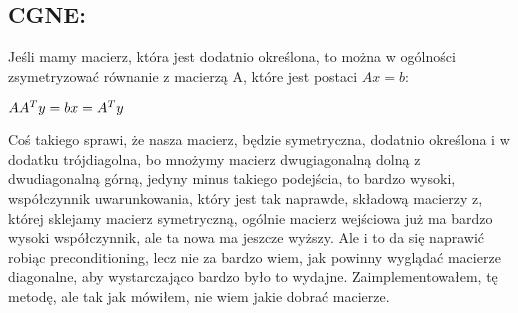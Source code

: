 \documentclass[12pt]{article}
\begin{document}
\subsection{CGNE: }
Jeśli mamy macierz, która jest dodatnio określona, to można w ogólności zsymetryzować równanie z macierzą A, które jest postaci $Ax=b$:
\begin{center}
$
AA^{T}y=b \newline
x=A^{T}y
$
\end{center}
Coś takiego sprawi, że nasza macierz, będzie symetryczna, dodatnio określona i w dodatku trójdiagolna, bo mnożymy macierz dwugiagonalną dolną z dwudiagonalną górną, jedyny minus takiego podejścia, to bardzo wysoki, współczynnik uwarunkowania, który jest tak naprawde, składową macierzy z, której sklejamy macierz symetryczną, ogólnie macierz wejściowa już ma bardzo wysoki współczynnik, ale ta nowa ma jeszcze wyższy. Ale i to da się naprawić robiąc preconditioning, lecz nie za bardzo wiem, jak powinny wyglądać macierze diagonalne, aby wystarczająco bardzo było to wydajne. Zaimplementowałem, tę metodę, ale tak jak mówiłem, nie wiem jakie dobrać macierze.
\end{document}
